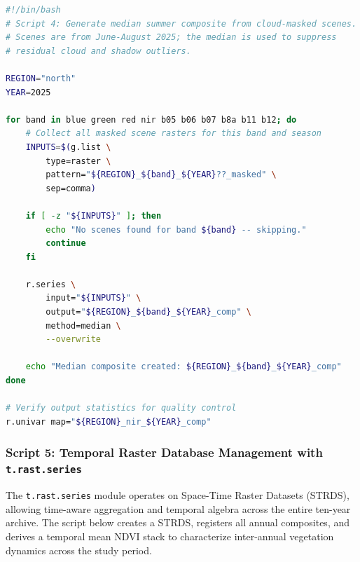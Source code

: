 \documentclass[remotesensing,article,submit,pdftex,moreauthors]{Definitions/mdpi}
\begin{document}
\begin{lstlisting}[language=bash, caption={Median summer compositing of Sentinel-2 scenes using \texttt{r.series}.}, label={lst:rseries}]
#!/bin/bash
# Script 4: Generate median summer composite from cloud-masked scenes.
# Scenes are from June-August 2025; the median is used to suppress
# residual cloud and shadow outliers.

REGION="north"
YEAR=2025

for band in blue green red nir b05 b06 b07 b8a b11 b12; do
    # Collect all masked scene rasters for this band and season
    INPUTS=$(g.list \
        type=raster \
        pattern="${REGION}_${band}_${YEAR}??_masked" \
        sep=comma)

    if [ -z "${INPUTS}" ]; then
        echo "No scenes found for band ${band} -- skipping."
        continue
    fi

    r.series \
        input="${INPUTS}" \
        output="${REGION}_${band}_${YEAR}_comp" \
        method=median \
        --overwrite

    echo "Median composite created: ${REGION}_${band}_${YEAR}_comp"
done

# Verify output statistics for quality control
r.univar map="${REGION}_nir_${YEAR}_comp"
\end{lstlisting}

\subsubsection*{Script 5: Temporal Raster Database Management with \texttt{t.rast.series}}

The \texttt{t.rast.series} module operates on Space-Time Raster Datasets (STRDS), allowing time-aware aggregation and temporal algebra across the entire ten-year archive. The script below creates a STRDS, registers all annual composites, and derives a temporal mean NDVI stack to characterize inter-annual vegetation dynamics across the study period.
\end{document}
